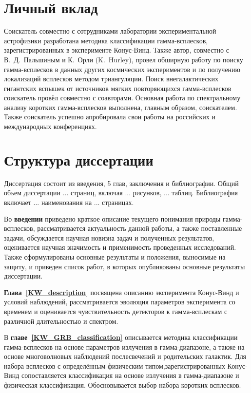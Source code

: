 \section*{Личный вклад}
Соискатель совместно с сотрудниками лаборатории экспериментальной астрофизики 
разработана методика классификации гамма-всплесков, зарегистрированных в эксперименте 
Конус-Винд. Также автор, совместно с В.~Д.~Пальшиным и К.~Орли (K.~Hurley), 
провел обширную работу по поиску гамма-всплесков в данных других космических 
экспериментов и по получению локализаций всплесков методом триангуляции.
Поиск внегалактических гигантских вспышек от источников мягких повторяющихся
гамма-всплесков соискатель провёл совместно с соавторами. 
Основная работа по спектральному анализу коротких гамма-всплесков выполнена, главным образом, соискателем.
Также соискатель успешно апробировала свои работы на российских и международных конференциях.

\section*{Структура диссертации}
Диссертация состоит из введения, 5 глав, заключения и библиографии.
Общий объем диссертации ... страниц, включая ... рисунков, ... таблиц. 
Библиография включает ... наименования на ... страницах.

Во \textbf{введении} приведено краткое описание текущего понимания природы гамма-всплесков,
рассматривается актуальность данной работы, а также поставленные задачи, 
обсуждается научная новизна задач и полученных результатов, 
оценивается научная значимость и применимость проведенных исследований.
Также сформулированы основные результаты и положения, выносимые на защиту, и приведен
список работ, в которых опубликованы основные результаты диссертации.

\textbf{Глава~\ref{KW_description}} посвящена описанию эксперимента Конус-Винд и условий
наблюдений, рассматривается эволюция параметров эксперимента со временем и 
оценивается чувствительность детекторов к гамма-всплескам с различной длительностью и спектром.

В \textbf{главе~\ref{KW_GRB_classification}} описывается методика классификации 
гамма-всплесков на основе параметров излучения в гамма-диапазоне, а также на основе 
многоволновых наблюдений послесвечений и родительских галактик. Для набора всплесков
с определённым физическим типом,зарегистрированных Конус-Винд сопоставляется 
классификация на основе излучения в гамма-диапазоне и физическая классификация.
Обосновывается выбор набора коротких всплесков.

